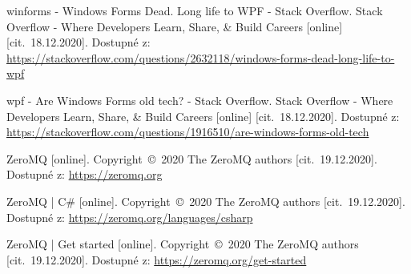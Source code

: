 \begin{thebibliography}{99}
 winforms - Windows Forms Dead. Long life to WPF - Stack Overflow. Stack Overflow - Where Developers Learn, Share, \& Build Careers [online] [cit.~18.12.2020]. Dostupné z: \url{https://stackoverflow.com/questions/2632118/windows-forms-dead-long-life-to-wpf}

 wpf - Are Windows Forms old tech? - Stack Overflow. Stack Overflow - Where Developers Learn, Share, \& Build Careers [online] [cit.~18.12.2020]. Dostupné z: \url{https://stackoverflow.com/questions/1916510/are-windows-forms-old-tech}

 ZeroMQ [online]. Copyright~©~2020 The ZeroMQ authors [cit.~19.12.2020]. Dostupné z: \url{https://zeromq.org}

 ZeroMQ | C\# [online]. Copyright~©~2020 The ZeroMQ authors [cit.~19.12.2020]. Dostupné z: \url{https://zeromq.org/languages/csharp}

 ZeroMQ | Get started [online]. Copyright~©~2020 The ZeroMQ authors [cit.~19.12.2020]. Dostupné z: \url{https://zeromq.org/get-started}

\end{thebibliography}
\newpage
